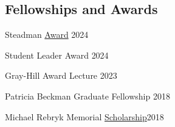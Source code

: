\documentclass[margin,line]{res}
\newenvironment{list1}{
  \begin{list}{\ding{113}}{%
      \setlength{\itemsep}{0in}
      \setlength{\parsep}{0in} \setlength{\parskip}{0in}
      \setlength{\topsep}{0in} \setlength{\partopsep}{0in} 
      \setlength{\leftmargin}{0.17in}}}{\end{list}}
\newenvironment{list2}{
  \begin{list}{$\bullet$}{%
      \setlength{\itemsep}{0in}
      \setlength{\parsep}{0in} \setlength{\parskip}{0in}
      \setlength{\topsep}{0in} \setlength{\partopsep}{0in} 
      \setlength{\leftmargin}{0.2in}}}{\end{list}}
\begin{document}
\begin{resume}

%






\section{\sc Fellowships  \newline and Awards}
Steadman \href{https://www.rochester.edu/college/gradstudies/postdocs/steadman-awards.html}{Award} \hfill{2024}

\vspace*{-2.5mm}

Student Leader Award \hfill {2024}

\vspace*{-2.5mm}

Gray-Hill Award Lecture \hfill{2023}

\vspace*{-2.5mm}

Patricia Beckman Graduate Fellowship \hfill {2018}

\vspace*{-2.5mm}

Michael Rebryk Memorial  \href{http://ucu-building-community.blogspot.ca/2016/03/ucu-adds-new-scholarships-in-2016.html}{Scholarship}\hfill {2018}


\end{resume}
\end{document}
